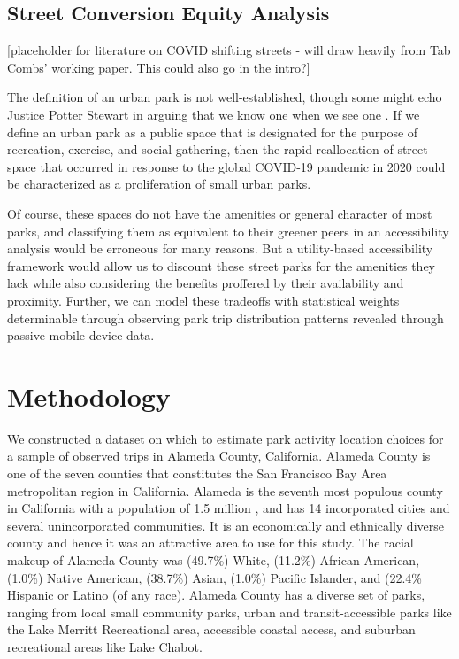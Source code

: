 \documentclass[3p, authoryear]{elsarticle} %
\begin{document}
\hypertarget{street-conversion-equity-analysis}{%
\subsection{Street Conversion Equity Analysis}\label{street-conversion-equity-analysis}}

{[}placeholder for literature on COVID shifting streets - will draw heavily from
Tab Combs' working paper. This could also go in the intro?{]}

The definition of an urban park is not well-established, though some might echo
Justice Potter Stewart in arguing that we know one when we see one
\citep{1964jacobellis}. If we define an urban park as a public space that is
designated for the purpose of recreation, exercise, and social gathering, then
the rapid reallocation of street space that occurred in response to the global
COVID-19 pandemic in 2020 could be characterized as a proliferation of
small urban parks.

Of course, these spaces do not have the amenities or general character of most
parks, and classifying them as equivalent to their greener peers in an
accessibility analysis would be erroneous for many reasons. But a utility-based
accessibility framework would allow us to discount these street parks for the
amenities they lack while also considering the benefits proffered by their
availability and proximity. Further, we can model these tradeoffs with
statistical weights determinable through observing park trip distribution
patterns revealed through passive mobile device data.

\hypertarget{methodology}{%
\section{Methodology}\label{methodology}}

We constructed a dataset on which to estimate park activity location choices for
a sample of observed trips in Alameda County, California. Alameda County is one
of the seven counties that constitutes the San Francisco Bay Area metropolitan
region in California. Alameda is the seventh most populous county in California
with a population of 1.5 million \citep{alamedafacts}, and has 14 incorporated cities
and several unincorporated communities. It is an economically and ethnically
diverse county and hence it was an attractive area to use for this study. The
racial makeup of Alameda County was (49.7\%) White, (11.2\%) African American,
(1.0\%) Native American, (38.7\%) Asian, (1.0\%) Pacific Islander, and (22.4\%
Hispanic or Latino (of any race). Alameda County has a diverse set of parks,
ranging from local small community parks, urban and transit-accessible parks
like the Lake Merritt Recreational area, accessible coastal access, and suburban
recreational areas like Lake Chabot.
\end{document}
